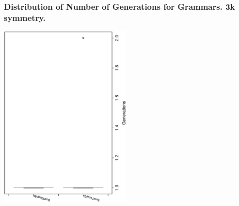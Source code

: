  \begin{frame}
 \frametitle{ Distribution of Number of Generations for Grammars. 3k  symmetry. }
 \begin{center}
\includegraphics[width=0.5\textwidth, angle=-90]
{ExpEboxplottGenerations001.eps}
 \end{center}
 \label{ExpEboxplottGenerations001.eps}  
 \end{frame}

